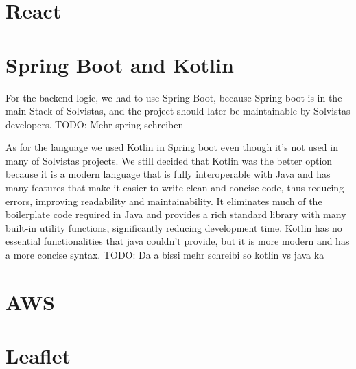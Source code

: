 \section{React}

\section{Spring Boot and Kotlin}
For the backend logic, we had to use Spring Boot, because Spring boot is in the main Stack of Solvistas, and the project should later be maintainable by Solvistas developers. TODO: Mehr spring schreiben

As for the language we used Kotlin in Spring boot even though it's not used in many of Solvistas projects. We still decided that Kotlin was the better option because it is a modern language that is fully interoperable with Java and has many features that make it easier to write clean and concise code, thus reducing errors, improving readability and maintainability. It eliminates much of the boilerplate code required in Java and provides a rich standard library with many built-in utility functions, significantly reducing development time. Kotlin has no essential functionalities that java couldn't provide, but it is more modern and has a more concise syntax. TODO: Da a bissi mehr schreibi so kotlin vs java ka


\section{AWS}

\section{Leaflet}
